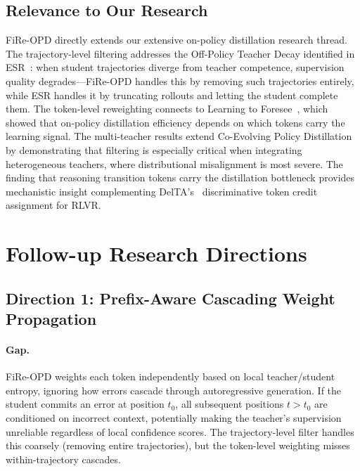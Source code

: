 \documentclass[11pt,a4paper]{article}
\begin{document}
\subsection{Relevance to Our Research}

FiRe-OPD directly extends our extensive on-policy distillation research thread. The trajectory-level filtering addresses the Off-Policy Teacher Decay identified in ESR~\cite{esr2026}: when student trajectories diverge from teacher competence, supervision quality degrades---FiRe-OPD handles this by removing such trajectories entirely, while ESR handles it by truncating rollouts and letting the student complete them. The token-level reweighting connects to Learning to Foresee~\cite{foresee2026}, which showed that on-policy distillation efficiency depends on which tokens carry the learning signal. The multi-teacher results extend Co-Evolving Policy Distillation~\cite{coevol2026} by demonstrating that filtering is especially critical when integrating heterogeneous teachers, where distributional misalignment is most severe. The finding that reasoning transition tokens carry the distillation bottleneck provides mechanistic insight complementing DelTA's~\cite{delta2026} discriminative token credit assignment for RLVR.

\section{Follow-up Research Directions}

\subsection{Direction 1: Prefix-Aware Cascading Weight Propagation}

\paragraph{Gap.} FiRe-OPD weights each token independently based on local teacher/student entropy, ignoring how errors cascade through autoregressive generation. If the student commits an error at position $t_0$, all subsequent positions $t > t_0$ are conditioned on incorrect context, potentially making the teacher's supervision unreliable regardless of local confidence scores. The trajectory-level filter handles this coarsely (removing entire trajectories), but the token-level weighting misses within-trajectory cascades.
\end{document}
